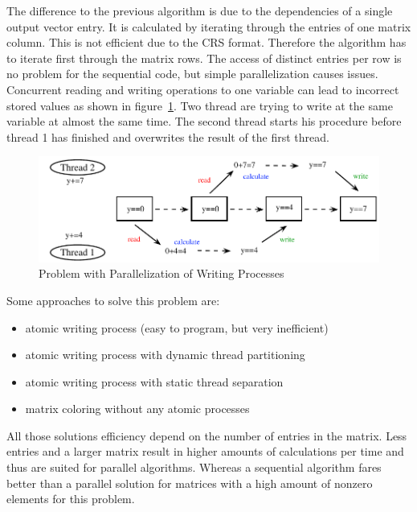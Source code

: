 \documentclass[a4paper,11pt]{scrartcl}
\begin{document}
The difference to the previous algorithm is due to the dependencies of a single
output vector entry. It is calculated by iterating through the entries
of one matrix column. This is not efficient due to the CRS format.
Therefore the algorithm has to iterate first through the matrix rows.
The access of distinct entries per row is no problem for the sequential
code, but simple parallelization causes issues.
Concurrent reading and writing operations to one variable can lead to incorrect
stored values as shown in figure~\ref{figure:parallelwriting}. Two
thread are trying to write at the same variable at almost the same time. The
second thread starts his procedure before thread 1 has finished and overwrites the
result of the first thread.

\begin{figure}[ht]
\includegraphics{graphic/parallel_writing_problem.pdf}
\caption{Problem with Parallelization of Writing Processes}\label{figure:parallelwriting}
\end{figure}

\begin{samepage}
Some approaches to solve this problem are:
\begin{itemize}
\item atomic writing process (easy to program, but very inefficient)
\item atomic writing process with dynamic thread partitioning
\item atomic writing process with static thread separation
\item matrix coloring without any atomic processes
\end{itemize}
\end{samepage}

All those solutions efficiency depend on the number of entries in the matrix.
Less entries and a larger matrix result in higher amounts of calculations per
time and thus are suited for parallel algorithms.
Whereas a sequential algorithm fares better than a parallel solution for
matrices with a high amount of nonzero elements for this problem.
\end{document}

